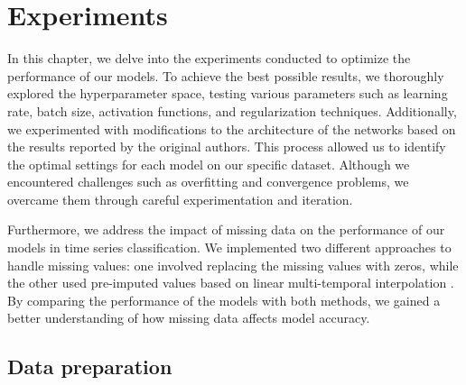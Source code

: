 \chapter{Experiments}

In this chapter, we delve into the experiments conducted to optimize the performance of our models.
To achieve the best possible results, we thoroughly explored the hyperparameter space, testing various parameters such as learning rate, batch size, activation functions, and regularization techniques.
Additionally, we experimented with modifications to the architecture of the networks based on the results reported by the original authors.
This process allowed us to identify the optimal settings for each model on our specific dataset. 
Although we encountered challenges such as overfitting and convergence problems, we overcame them through careful experimentation and iteration.

Furthermore, we address the impact of missing data on the performance of our models in time series classification.
We implemented two different approaches to handle missing values: one involved replacing the missing values with zeros, while the other used pre-imputed values based on linear multi-temporal interpolation \cite{IENCO201911}.
By comparing the performance of the models with both methods, we gained a better understanding of how missing data affects model accuracy.




\section{Data preparation}

